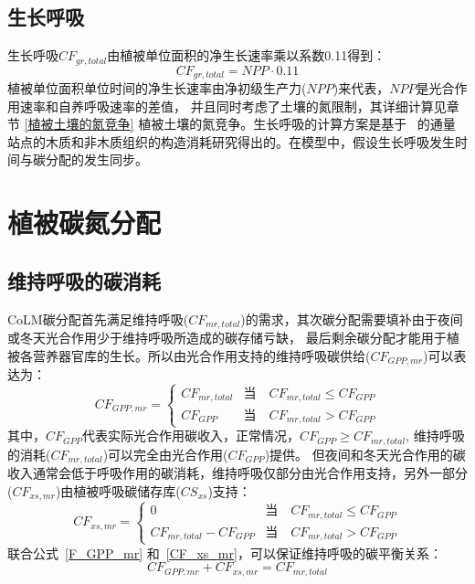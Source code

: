 \subsection{生长呼吸}\label{生长呼吸}
生长呼吸$CF_{gr,total}$由植被单位面积的净生长速率乘以系数0.11得到：
\begin{equation}
CF_{gr,total}=NPP \cdot 0.11
\end{equation}
植被单位面积单位时间的净生长速率由净初级生产力($NPP$)来代表，$NPP$是光合作用速率和自养呼吸速率的差值，
并且同时考虑了土壤的氮限制，其详细计算见章节 \ref{植被土壤的氮竞争} 植被土壤的氮竞争。生长呼吸的计算方案是基于~\citet{atkins2018quantifying}
的通量站点的木质和非木质组织的构造消耗研究得出的。在模型中，假设生长呼吸发生时间与碳分配的发生同步。


\section{植被碳氮分配}\label{植被碳氮分配}
\subsection{维持呼吸的碳消耗}
CoLM碳分配首先满足维持呼吸($CF_{mr,total}$)的需求，其次碳分配需要填补由于夜间或冬天光合作用少于维持呼吸所造成的碳存储亏缺，
最后剩余碳分配才能用于植被各营养器官库的生长。所以由光合作用支持的维持呼吸碳供给($CF_{GPP,mr}$)可以表达为：
\begin{equation}\label{F_GPP_mr}
CF_{GPP,mr}=\left\{\begin{array}{cl}CF_{mr, total} & \text{当}\quad CF_{mr, total} \leqslant CF_{GPP} \\ CF_{GPP} & \text{当}\quad CF_{mr,total}>CF_{GPP} \end{array}\right.
\end{equation}
其中，$CF_{GPP}$代表实际光合作用碳收入，正常情况，$CF_{GPP}\geq CF_{mr,total}$,
维持呼吸的消耗($CF_{mr,total}$)可以完全由光合作用($CF_{GPP}$)提供。
但夜间和冬天光合作用的碳收入通常会低于呼吸作用的碳消耗，维持呼吸仅部分由光合作用支持，另外一部分($CF_{xs,mr}$)由植被呼吸碳储存库($CS_{xs}$)支持：
\begin{equation}\label{CF_xs_mr}
CF_{xs, mr}=\left\{\begin{array}{cl}0 & \text{当}\quad CF_{mr, total} \leqslant CF_{GPP} \\ CF_{mr, total}-CF_{GPP} & \text{当}\quad CF_{mr, total}>CF_{GPP}\end{array}\right.
\end{equation}
联合公式~\eqref{F_GPP_mr} 和~\eqref{CF_xs_mr}，可以保证维持呼吸的碳平衡关系：
\begin{equation}
CF_{GPP, mr}+CF_{xs, mr}=CF_{mr, total}
\end{equation}


